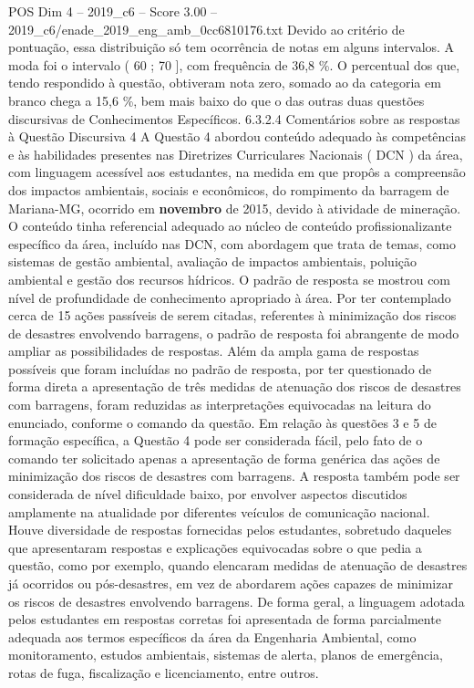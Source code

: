 \begin{textsample}{POS Dim 4 – 2019\_c6 – Score 3.00 – 2019\_c6/enade\_2019\_eng\_amb\_0cc6810176.txt}
Devido ao critério de pontuação, essa distribuição só tem ocorrência de notas em alguns intervalos.
A moda foi o intervalo ( 60 ; 70 ], com frequência de 36,8 \%.
O percentual dos que, tendo respondido à questão, obtiveram nota zero, somado ao da categoria em branco chega a 15,6 \%, bem mais baixo do que o das outras duas questões discursivas de Conhecimentos Específicos. 6.3.2.4 Comentários sobre as respostas à Questão Discursiva 4 A Questão 4 abordou conteúdo adequado às competências e às habilidades presentes nas Diretrizes Curriculares Nacionais ( DCN ) da área, com linguagem acessível aos estudantes, na medida em que propôs a compreensão dos impactos ambientais, sociais e econômicos, do rompimento da barragem de Mariana-MG, ocorrido em \textbf{novembro} de 2015, devido à atividade de mineração.
O conteúdo tinha referencial adequado ao núcleo de conteúdo profissionalizante específico da área, incluído nas DCN, com abordagem que trata de temas, como sistemas de gestão ambiental, avaliação de impactos ambientais, poluição ambiental e gestão dos recursos hídricos.
O padrão de resposta se mostrou com nível de profundidade de conhecimento apropriado à área.
Por ter contemplado cerca de 15 ações passíveis de serem citadas, referentes à minimização dos riscos de desastres envolvendo barragens, o padrão de resposta foi abrangente de modo ampliar as possibilidades de respostas.
Além da ampla gama de respostas possíveis que foram incluídas no padrão de resposta, por ter questionado de forma direta a apresentação de três medidas de atenuação dos riscos de desastres com barragens, foram reduzidas as interpretações equivocadas na leitura do enunciado, conforme o comando da questão.
Em relação às questões 3 e 5 de formação específica, a Questão 4 pode ser considerada fácil, pelo fato de o comando ter solicitado apenas a apresentação de forma genérica das ações de minimização dos riscos de desastres com barragens.
A resposta também pode ser considerada de nível dificuldade baixo, por envolver aspectos discutidos amplamente na atualidade por diferentes veículos de comunicação nacional.
Houve diversidade de respostas fornecidas pelos estudantes, sobretudo daqueles que apresentaram respostas e explicações equivocadas sobre o que pedia a questão, como por exemplo, quando elencaram medidas de atenuação de desastres já ocorridos ou pós-desastres, em vez de abordarem ações capazes de minimizar os riscos de desastres envolvendo barragens.
De forma geral, a linguagem adotada pelos estudantes em respostas corretas foi apresentada de forma parcialmente adequada aos termos específicos da área da Engenharia Ambiental, como monitoramento, estudos ambientais, sistemas de alerta, planos de emergência, rotas de fuga, fiscalização e licenciamento, entre outros.

\end{textsample}
